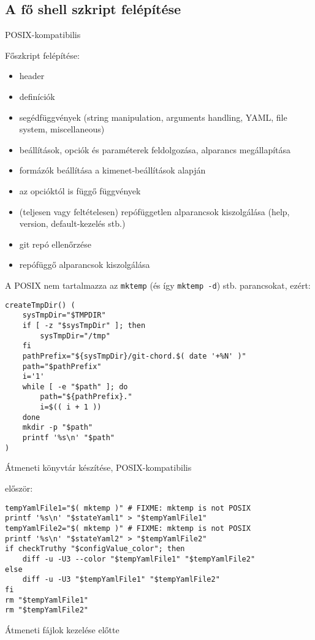 \documentclass[final]{elteikthesis}[2025/03/25]
\begin{document}
\subsection{A fő shell szkript felépítése}

POSIX-kompatibilis

Főszkript felépítése:

\begin{itemize}
    \item header
    \item definíciók
    \item segédfüggvények (string manipulation, arguments handling, YAML, file system, miscellaneous)
    \item beállítások, opciók és paraméterek feldolgozása, alparancs megállapítása
    \item formázók beállítása a kimenet-beállítások alapján
    \item az opcióktól is függő függvények
    \item (teljesen vagy feltételesen) repófüggetlen alparancsok kiszolgálása (help, version, default-kezelés stb.)
    \item git repó ellenőrzése
    \item repófüggő alparancsok kiszolgálása
\end{itemize}

A POSIX nem tartalmazza az \verb|mktemp| (és így \verb|mktemp -d|) stb. parancsokat, ezért:

\begin{listing}[H]
\begin{verbatim}
createTmpDir() (
    sysTmpDir="$TMPDIR"
    if [ -z "$sysTmpDir" ]; then
        sysTmpDir="/tmp"
    fi
    pathPrefix="${sysTmpDir}/git-chord.$( date '+%N' )"
    path="$pathPrefix"
    i='1'
    while [ -e "$path" ]; do
        path="${pathPrefix}."
        i=$(( i + 1 ))
    done
    mkdir -p "$path"
    printf '%s\n' "$path"
)
\end{verbatim}
\caption{Átmeneti könyvtár készítése, POSIX-kompatibilis}
\end{listing}

először:

\begin{listing}[H]
\begin{verbatim}
tempYamlFile1="$( mktemp )" # FIXME: mktemp is not POSIX
printf '%s\n' "$stateYaml1" > "$tempYamlFile1"
tempYamlFile2="$( mktemp )" # FIXME: mktemp is not POSIX
printf '%s\n' "$stateYaml2" > "$tempYamlFile2"
if checkTruthy "$configValue_color"; then
    diff -u -U3 --color "$tempYamlFile1" "$tempYamlFile2"
else
    diff -u -U3 "$tempYamlFile1" "$tempYamlFile2"
fi
rm "$tempYamlFile1"
rm "$tempYamlFile2"
\end{verbatim}
\caption{Átmeneti fájlok kezelése előtte}
\end{listing}
\end{document}
